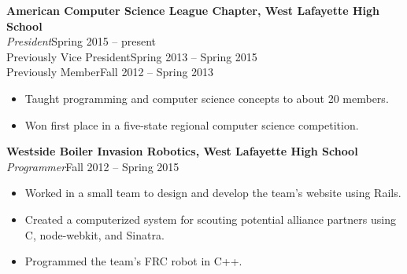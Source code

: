 \documentclass[line,margin]{res}
\begin{document}
\begin{resume}
  {\bf\rmfamily American Computer Science League Chapter, West Lafayette High School}\\
  \emph{President}\hfill Spring 2015 -- present\\
  Previously Vice President\hfill Spring 2013 -- Spring 2015\\
  Previously Member\hfill Fall 2012 -- Spring 2013
  \begin{itemize}  \itemsep -2pt %
  \item Taught programming and computer science concepts to about 20 members.
  \item Won first place in a five-state regional computer science competition.
  \end{itemize}

  {\bf\rmfamily  Westside Boiler Invasion Robotics, West Lafayette High School}\\
  \emph{Programmer}\hfill Fall 2012 -- Spring 2015
  \begin{itemize}  \itemsep -2pt %
  \item Worked in a small team to design and develop the team's website using Rails.
  \item Created a computerized system for scouting potential alliance partners using C, node-webkit, and Sinatra.
  \item Programmed the team's FRC robot in C++.
  \end{itemize}






\end{resume}
\end{document}
